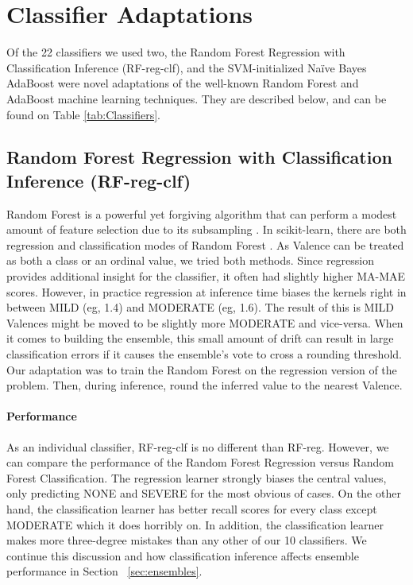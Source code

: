 \section{Classifier Adaptations}\label{sec:newml}

Of the 22 classifiers we used two, the Random Forest Regression with Classification Inference (\textsf{RF-reg-clf}), and the SVM-initialized
Na\"{i}ve Bayes AdaBoost were novel adaptations of the well-known
Random Forest \cite{breiman01, ho95} and AdaBoost \cite{adaboost} machine learning
techniques. They are described below, and can be found on Table \ref{tab:Classifiers}.

\subsection{Random Forest Regression with Classification Inference (RF-reg-clf)}
Random Forest is a powerful yet forgiving algorithm that can perform a modest amount of feature selection due to its subsampling \cite{breiman01, ho95}. In \textsf{scikit-learn}, there are both regression and classification modes of Random Forest \cite{scikit-learn}. As Valence can be treated as both a class or an ordinal value, we tried both methods. Since regression provides additional insight for the classifier, it often had slightly higher \textsf{MA-MAE} scores. However, in practice regression at inference time biases the kernels right in between \textsf{MILD} (eg, 1.4) and \textsf{MODERATE} (eg, 1.6). The result of this is \textsf{MILD} Valences might be moved to be slightly more \textsf{MODERATE} and vice-versa. When it comes to building the ensemble, this small amount of drift can result in large classification errors if it causes the ensemble's vote to cross a rounding threshold. Our adaptation was to train the Random Forest on the regression version of the problem. Then, during inference, round the inferred value to the nearest Valence. 

\paragraph{Performance} As an individual classifier, \textsf{RF-reg-clf} is no different than \textsf{RF-reg}. However, we can compare the performance of the Random Forest Regression versus Random Forest Classification. The regression learner strongly biases the central values, only predicting \textsf{NONE} and \textsf{SEVERE} for the most obvious of cases. On the other hand, the classification learner has better recall scores for every class except \textsf{MODERATE} which it does horribly on. In addition, the classification learner makes more three-degree mistakes than any other of our 10 classifiers. We continue this discussion and how classification inference affects ensemble performance in Section ~\ref{sec:ensembles}.

